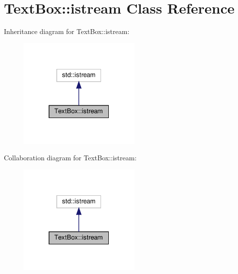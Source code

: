 \hypertarget{a00028}{}\section{Text\+Box\+:\+:istream Class Reference}
\label{a00028}


Inheritance diagram for Text\+Box\+:\+:istream\+:\nopagebreak
\begin{figure}[H]
\begin{center}
\leavevmode
\includegraphics[width=172pt]{a00027}
\end{center}
\end{figure}


Collaboration diagram for Text\+Box\+:\+:istream\+:\nopagebreak
\begin{figure}[H]
\begin{center}
\leavevmode
\includegraphics[width=172pt]{a00026}
\end{center}
\end{figure}
